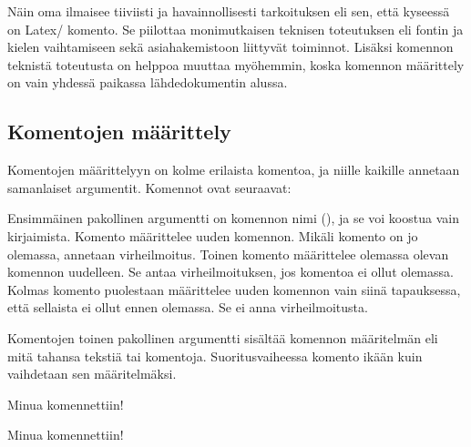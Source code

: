 
\noindent
Näin oma  ilmaisee tiiviisti ja havainnollisesti
tarkoituksen eli sen, että kyseessä on Latex\-/ komento. Se piilottaa
monimutkaisen teknisen toteutuksen eli fontin ja kielen vaihtamiseen
sekä asiahakemistoon liittyvät toiminnot. Lisäksi komennon teknistä
toteutusta on helppoa muuttaa myöhemmin, koska komennon määrittely on
vain yhdessä paikassa lähdedokumentin alussa.

\subsection{Komentojen määrittely}
\label{luku/komennot-määrittely}

Komentojen määrittelyyn on kolme erilaista komentoa, ja niille kaikille
annetaan samanlaiset argumentit. Komennot ovat seuraavat:

\begin{koodilohkosis}
\newcommand     {\nimi}[n][oletus]{määritelmä}
\renewcommand   {\nimi}[n][oletus]{määritelmä}
\providecommand {\nimi}[n][oletus]{määritelmä}
\end{koodilohkosis}

\noindent
Ensimmäinen pakollinen argumentti on komennon nimi (), ja
se voi koostua vain kirjaimista. Komento 
määrittelee uuden komennon. Mikäli komento on jo olemassa, annetaan
virheilmoitus. Toinen komento  määrittelee
olemassa olevan komennon uudelleen. Se antaa virheilmoituksen, jos
komentoa ei ollut olemassa. Kolmas komento 
puolestaan määrittelee uuden komennon vain siinä tapauksessa, että
sellaista ei ollut ennen olemassa. Se ei anna virheilmoitusta.

Komentojen toinen pakollinen argumentti  sisältää
komennon määritelmän eli mitä tahansa tekstiä tai komentoja.
Suoritusvaiheessa komento ikään kuin vaihdetaan sen määritelmäksi.

\begin{koodilohkosis}
\newcommand{\komento}{Minua komennettiin!}
\komento
\end{koodilohkosis}

\begin{tulossis}
  Minua komennettiin!
\end{tulossis}

